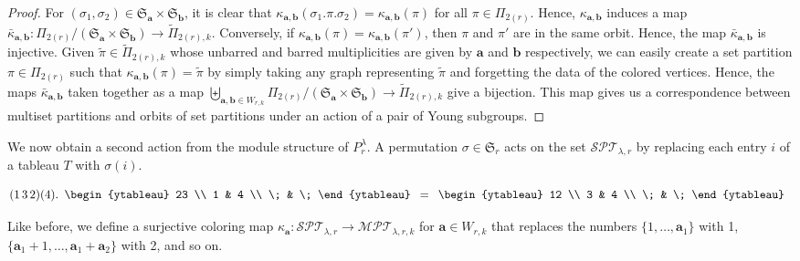 \documentclass[ALCO,Unicode,published]{cedram}
\newcommand{\SG}{\mathfrak{S}}
\newcommand{\bfa}{{\boldsymbol{a}}}
\newcommand{\bfb}{{\boldsymbol{b}}}
\newcommand{\MPT}{\mathcal{MPT}}
\newcommand{\SPT}{\mathcal{SPT}}
\newcommand{\tpi}{{\tilde{\pi}}}
\newcommand{\ov}[1]{\bar{#1}}
\newcommand{\inline}[1]{\begin{array}{c}#1\end{array}}
\begin{document}
\begin{proof}

For $(\sigma_1,\sigma_2)\in \SG_\bfa\times\SG_\bfb$, it is clear that $\kappa_{\bfa,\bfb}(\sigma_1.\pi.\sigma_2)=\kappa_{\bfa,\bfb}(\pi)$ for all $\pi\in\Pi_{2(r)}$. Hence, $\kappa_{\bfa,\bfb}$ induces a map $\ov\kappa_{\bfa,\bfb}:\Pi_{2(r)}/(\SG_\bfa\times\SG_\bfb)\rightarrow\tilde\Pi_{2(r),k}$. Conversely, if $\kappa_{\bfa,\bfb}(\pi)=\kappa_{\bfa,\bfb}(\pi')$, then $\pi$ and $\pi'$ are in the same orbit. Hence, the map $\ov\kappa_{\bfa,\bfb}$ is injective. Given $\tpi\in\tilde\Pi_{2(r),k}$ whose unbarred and barred multiplicities are given by $\bfa$ and $\bfb$ respectively, we can easily create a set partition $\pi\in\Pi_{2(r)}$ such that $\kappa_{\bfa,\bfb}(\pi)=\tpi$ by simply taking any graph representing $\tpi$ and forgetting the data of the colored vertices. Hence, the maps $\ov\kappa_{\bfa,\bfb}$ taken together as a map $\biguplus_{\bfa,\bfb\in W_{r,k}} \Pi_{2(r)}/(\SG_\bfa\times\SG_\bfb)\to\tilde\Pi_{2(r),k}$ give a bijection. This map gives us a correspondence between multiset partitions and orbits of set partitions under an action of a pair of Young subgroups.
\end{proof}

We now obtain a second action from the module structure of $P_r^\lambda$. A permutation $\sigma\in\SG_r$ acts on the set $\SPT_{\lambda,r}$ by replacing each entry $i$ of a tableau $T$ with $\sigma(i)$.

\begin{exam}
    \[(1\,3\,2)(4).\inline{\begin{ytableau}
        23 \\
        1 & 4 \\
        \; & \;
    \end{ytableau}}=\inline{\begin{ytableau}
        12 \\
        3 & 4 \\
        \; & \;
    \end{ytableau}}\]
\end{exam}

Like before, we define a surjective coloring map $\kappa_\bfa:\SPT_{\lambda,r}\to\MPT_{\lambda,r,k}$ for $\bfa\in W_{r,k}$ that replaces the numbers $\{1,\dots,\bfa_1\}$ with 1, $\{\bfa_1+1,\dots,\bfa_1+\bfa_2\}$ with 2, and so on.
\end{document}
